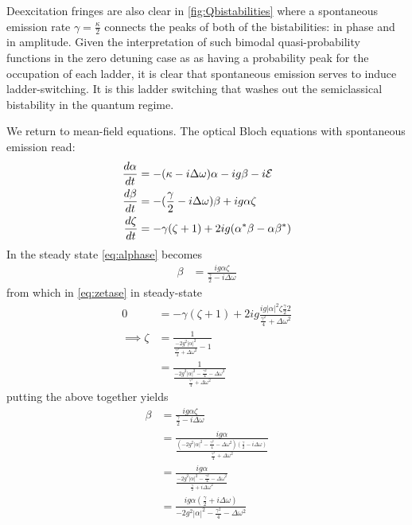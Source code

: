 Deexcitation fringes are also clear in \ref{fig:Qbistabilities} where a spontaneous emission rate $ \gamma = \frac{\kappa}{2}$ connects the peaks of both of the bistabilities: in phase and in amplitude. Given the interpretation of such bimodal quasi-probability functions in the zero detuning case as as having a probability peak for the occupation of each ladder, it is clear that spontaneous emission serves to induce ladder-switching. It is this ladder switching that washes out the semiclassical bistability in the quantum regime.

We return to mean-field equations. The optical Bloch equations with spontaneous emission read:
\begin{align}
  \frac{d \alpha}{dt} &= -(\kappa - i \Delta \omega)\alpha - ig \beta - i\mathcal{E}\label{eq:alphase}\\
  \frac{d \beta}{dt} &= -(\frac{\gamma}{2}-i\Delta\omega)\beta+ig\alpha\zeta \label{eq:betase}\\
  \frac{d\zeta}{dt} &= -\gamma (\zeta +1)+2ig(\alpha^*\beta-\alpha\beta^*) \label{eq:zetase}
\end{align}
In the steady state \cref{eq:alphase} becomes
\begin{align}
  \beta &= \frac{ig\alpha\zeta}{\frac{\gamma}{2}-i\Delta\omega}
\end{align}
from which in \cref{eq:zetase} in steady-state
\begin{align}
  0 &= -\gamma(\zeta+1)+2ig\frac{ig|\alpha|^2\zeta\frac{\gamma}{2}2}{\frac{\gamma^2}{4}+\Delta\omega^2} \\
  \implies \zeta &= \frac{1}{\frac{-2g^2|\alpha|^2}{\frac{\gamma^2}{4} +\Delta\omega^2}-1} \\
  &= \frac{1}{\frac{-2g^2|\alpha|^2 - \frac{\gamma^2}{4}-\Delta\omega^2}{\frac{\gamma^2}{4} +\Delta\omega^2}}
\end{align}
putting the above together yields
\begin{align}
  \beta &= \frac{ig\alpha\zeta}{\frac{\gamma}{2}-i\Delta\omega}\\
  &= \frac{ig\alpha}{\frac{(-2g^2|\alpha|^2-\frac{\gamma^2}{4}-\Delta\omega^2)(\frac{\gamma}{2}-i\Delta\omega)}{\frac{\gamma^2}{4}+\Delta\omega^2}}\\
  &= \frac{ig\alpha}{\frac{-2g^2|\alpha|^2-\frac{\gamma^2}{4}-\Delta\omega^2}{\frac{\gamma}{2}+i\Delta\omega^2}}\\
  &= \frac{ig\alpha(\frac{\gamma}{2}+i\Delta\omega)}{-2g^2|\alpha|^2-\frac{\gamma^2}{4}-\Delta\omega^2} \label{eq:betasolved}
\end{align}
